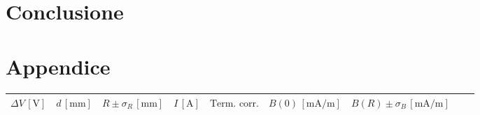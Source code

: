 \documentclass[]{article}
\let\oldsection\section%
\renewcommand{\section}{%
	\renewcommand{\theequation}{\thesection.\arabic{equation}}%
	\oldsection}%
\begin{document}
    \section{Conclusione}

    \newpage
    \section{Appendice}



\begin{table}[H]
    \centering

\begin{tabular}{||c|c|c|c|c|c|c|c|c||}
    \hline
    $\Delta V\, [\text{V}] $ & $d\, [\text{mm}] $ & $R \pm \sigma_R\, [\text{mm}] $ & $I\, [\text{A}] $ & $\text{Term. corr.}$ & $B(0)\, [\text{mA/m}] $ & $B(R) \pm \sigma_B\, [\text{mA/m}] $ \\
    \hline\hline
 

\end{tabular}
\end{table}
\end{document}
